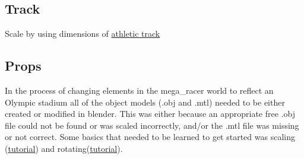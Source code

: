 \documentclass[a4 paper, 12pt]{article}
\begin{document}
\subsection{Track}

Scale by using dimensions of \href{https://www.dimensions.guide/element/track-and-field-400m-running-track}{athletic track}



\subsection{Props}

In the process of changing elements in the mega\_racer world to reflect an Olympic stadium all of the object models (.obj and .mtl) needed to be either created or modified in blender. This was either because an appropriate free .obj file could not be found or was scaled incorrectly, and/or the .mtl file was missing or not correct. Some basics that needed to be learned to get started was scaling (\href{https://www.youtube.com/watch?v=FPp3ClfDYqI}{tutorial}) and rotating(\href{https://www.youtube.com/watch?v=NUy2O13QH68}{tutorial}).
\end{document}
